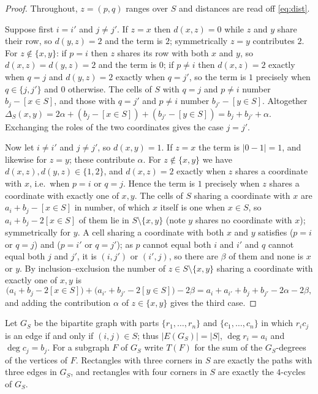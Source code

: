 \documentclass[11pt]{amsart}
\theoremstyle{remark}
\begin{document}
\begin{proof}
Throughout, $z=(p,q)$ ranges over $S$ and distances are read off
\eqref{eq:dist}.

Suppose first $i=i'$ and $j\ne j'$. If $z=x$ then $d(x,z)=0$ while $z$ and $y$
share their row, so $d(y,z)=2$ and the term is $2$; symmetrically $z=y$
contributes $2$. For $z\notin\{x,y\}$: if $p=i$ then $z$ shares its row with
both $x$ and $y$, so $d(x,z)=d(y,z)=2$ and the term is $0$; if $p\ne i$ then
$d(x,z)=2$ exactly when $q=j$ and $d(y,z)=2$ exactly when $q=j'$, so the term
is $1$ precisely when $q\in\{j,j'\}$ and $0$ otherwise. The cells of $S$ with
$q=j$ and $p\ne i$ number $b_j-[x\in S]$, and those with $q=j'$ and $p\ne i$
number $b_{j'}-[y\in S]$. Altogether
$\Delta_S(x,y)=2\alpha+(b_j-[x\in S])+(b_{j'}-[y\in S])=b_j+b_{j'}+\alpha$.
Exchanging the roles of the two coordinates gives the case $j=j'$.

Now let $i\ne i'$ and $j\ne j'$, so $d(x,y)=1$. If $z=x$ the term is
$\lvert0-1\rvert=1$, and likewise for $z=y$; these contribute $\alpha$. For
$z\notin\{x,y\}$ we have $d(x,z),d(y,z)\in\{1,2\}$, and $d(x,z)=2$ exactly when
$z$ shares a coordinate with $x$, i.e.\ when $p=i$ or $q=j$. Hence the term is
$1$ precisely when $z$ shares a coordinate with exactly one of $x,y$. The cells
of $S$ sharing a coordinate with $x$ are $a_i+b_j-[x\in S]$ in number, of which
$x$ itself is one when $x\in S$, so $a_i+b_j-2[x\in S]$ of them lie in
$S\setminus\{x,y\}$ (note $y$ shares no coordinate with $x$); symmetrically for
$y$. A cell sharing a coordinate with both $x$ and $y$ satisfies
($p=i$ or $q=j$) and ($p=i'$ or $q=j'$); as $p$ cannot equal both $i$ and $i'$
and $q$ cannot equal both $j$ and $j'$, it is $(i,j')$ or $(i',j)$, so there
are $\beta$ of them and none is $x$ or $y$. By inclusion--exclusion the number
of $z\in S\setminus\{x,y\}$ sharing a coordinate with exactly one of $x,y$ is
\[
  \bigl(a_i+b_j-2[x\in S]\bigr)+\bigl(a_{i'}+b_{j'}-2[y\in S]\bigr)-2\beta
  =a_i+a_{i'}+b_j+b_{j'}-2\alpha-2\beta,
\]
and adding the contribution $\alpha$ of $z\in\{x,y\}$ gives the third case.
\end{proof}

Let $G_S$ be the bipartite graph with parts $\{r_1,\dots,r_n\}$ and
$\{c_1,\dots,c_n\}$ in which $r_ic_j$ is an edge if and only if $(i,j)\in S$;
thus $\lvert E(G_S)\rvert=\lvert S\rvert$, $\deg r_i=a_i$ and $\deg c_j=b_j$.
For a subgraph $F$ of $G_S$ write $T(F)$ for the sum of the $G_S$-degrees of
the vertices of $F$. Rectangles with three corners in $S$ are exactly the
paths with three edges in $G_S$, and rectangles with four corners in $S$ are
exactly the $4$-cycles of $G_S$.
\end{document}
